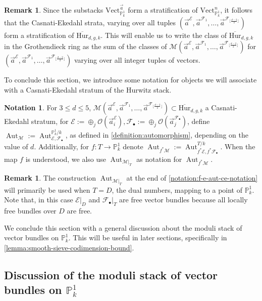 \documentclass[12 pt]{amsart}
\newcommand{\rboxed}[1]{#1}
\theoremstyle{plain}
\theoremstyle{definition}
\newtheorem{remark}[theorem]{Remark}
\newtheorem{notation}[theorem]{Notation}
\theoremstyle{remark}
\numberwithin{equation}{section}
\newcommand\bp{\mathbb P}
\newcommand\sce{\mathscr E}
\newcommand\scf{\mathscr F}
\newcommand\sco{\mathscr O}
\newcommand \ra{\rightarrow}
\newcommand\vect[2]{\mathrm{Vect}^{#1}_{#2}} %
\newcommand\vecthn[2]{\mathrm{Vect}^{#1}_{#2}} %
\newcommand\bighurg[3]{\overline{\mathrm{Hur}}_{#1,#2, #3}} %
\newcommand\ce{\mathscr M} %
\DeclareMathOperator\aut{Aut}
\begin{document}
\begin{remark} \label{remark:ce-loci-stratify} Since the substacks $\vecthn
	{\vec a} {\bp^1_k}$ form a stratification of $\vect n {\bp^1_k}$, it
	follows that the Casnati-Ekedahl strata, varying over all tuples $(\vec
	a^\sce, \vec a^{\scf_1} , \ldots, \vec a^{\scf_{\lfloor \frac{d-2}{2} \rfloor}} )$ form a
	stratification of $\bighurg d g k$.  
	This will enable us
		to write the class of $\bighurg d g k$ in the Grothendieck ring as
		the sum of the classes of $\ce(\vec a^\sce, \vec a^{\scf_1} ,
		\ldots, \vec a^{\scf_{\lfloor \frac{d-2}{2} \rfloor}} )$ for $(\vec a^\sce, \vec
		a^{\scf_1} , \ldots, \vec a^{\scf_{\lfloor \frac{d-2}{2} \rfloor}} )$ varying over all
		integer tuples of vectors.  
	\end{remark}

To conclude this section, we introduce some notation for objects we will
associate with a Casnati-Ekedahl stratum of the Hurwitz stack.
\begin{notation}
	\label{notation:f-e-aut-ce-notation}
	For $3 \leq d \leq 5$, $\ce(\vec a^\sce, \vec a^{\scf_1} , \ldots, \vec
	a^{\scf_{\lfloor \frac{d-2}{2} \rfloor}}) \subset \bighurg d g k$ a
	Casnati-Ekedahl stratum, for
	$\rboxed{\sce} :=\oplus_j \sco(\vec a^\sce_i), \rboxed{\scf_\bullet }:=
	\oplus_j \sco(\vec a^{\scf_\bullet}_j)$, define $\rboxed{\aut_{\ce}} :=
	\aut^{\bp^1_k/k}_{\sce, \scf_\bullet}$, as defined in
	\autoref{definition:automorphism}, depending on
	the value of $d$.  Additionally, for $f: T \ra \bp^1_k$ denote
	$\rboxed{\aut_{f^* \ce}} := \aut^{T/k}_{f^* \sce, f^* \scf_\bullet}$.
	When the map $f$ is understood, we also use $\aut_{\ce|_T}$ as notation
	for $\aut_{f^* \ce}$.
\end{notation}

\begin{remark} \label{remark:}
	The construction $\aut_{\ce|_T}$ at the end of
\autoref{notation:f-e-aut-ce-notation} will primarily be used when $T = D$,
the dual numbers, mapping to a point of $\bp^1_k$.  
Note that, in this case $\sce|_D$ and $\scf_\bullet|_T$ are free vector bundles
because all locally free bundles over $D$ are free.
\end{remark}

We conclude this section with a general discussion about the moduli stack of vector bundles on
$\bp^1_k$. This will be useful in later sections, specifically
in \autoref{lemma:smooth-sieve-codimension-bound}.

\subsection{Discussion of the moduli stack of vector bundles on $\mathbb P^1_k$}
\label{subsection:vector-bundle-closure}
\end{document}
